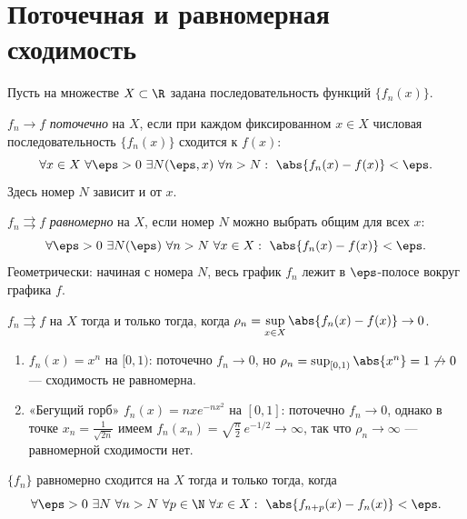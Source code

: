 \section{Поточечная и равномерная сходимость}

Пусть на множестве $X\subset\R$ задана последовательность функций $\{f_n(x)\}$.

\begin{definition}
$f_n\to f$ \emph{поточечно} на $X$, если при каждом фиксированном $x\in X$ числовая
последовательность $\{f_n(x)\}$ сходится к $f(x)$:
\[
  \forall x\in X\ \forall\eps>0\ \exists N(\eps,x)\ \forall n>N:\ \abs{f_n(x)-f(x)}<\eps .
\]
Здесь номер $N$ зависит и от $x$.
\end{definition}

\begin{definition}
$f_n\rightrightarrows f$ \emph{равномерно} на $X$, если номер $N$ можно выбрать общим для всех $x$:
\[
  \forall\eps>0\ \exists N(\eps)\ \forall n>N\ \forall x\in X:\ \abs{f_n(x)-f(x)}<\eps .
\]
Геометрически: начиная с номера $N$, весь график $f_n$ лежит в $\eps$-полосе вокруг графика $f$.
\end{definition}

\begin{criterion}
$f_n\rightrightarrows f$ на $X$ тогда и только тогда, когда
$\displaystyle\rho_n=\sup_{x\in X}\abs{f_n(x)-f(x)}\to0$.
\end{criterion}

\begin{example}\leavevmode
\begin{enumerate}[label=\arabic*),leftmargin=*]
  \item $f_n(x)=x^n$ на $[0,1)$: поточечно $f_n\to0$, но
        $\rho_n=\sup_{[0,1)}\abs{x^n}=1\not\to0$ — сходимость не равномерна.
  \item «Бегущий горб» $f_n(x)=nxe^{-nx^2}$ на $[0,1]$: поточечно $f_n\to0$, однако в точке
        $x_n=\tfrac{1}{\sqrt{2n}}$ имеем $f_n(x_n)=\sqrt{\tfrac{n}{2}}\,e^{-1/2}\to\infty$, так что
        $\rho_n\to\infty$ — равномерной сходимости нет.
\end{enumerate}
\end{example}

\begin{criterion}
$\{f_n\}$ равномерно сходится на $X$ тогда и только тогда, когда
\[
  \forall\eps>0\ \exists N\ \forall n>N\ \forall p\in\N\ \forall x\in X:\
  \abs{f_{n+p}(x)-f_n(x)}<\eps .
\]
\end{criterion}

